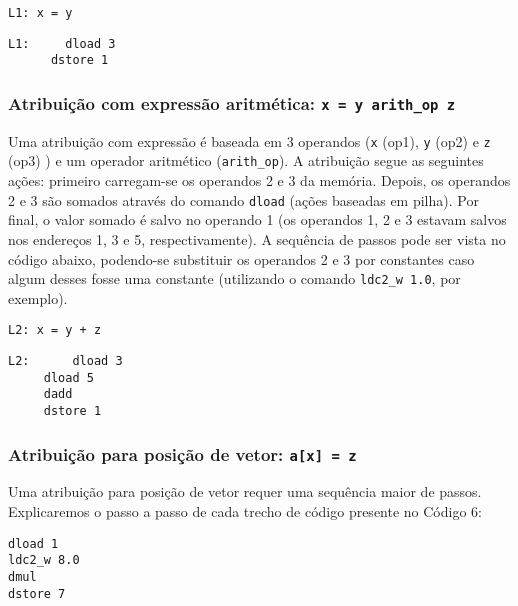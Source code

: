 \begin{lstlisting}[caption=Operação de atribuição em código intermediário.]
L1:	x = y
\end{lstlisting}


\begin{lstlisting}[caption=Operação de atribuição simples em Jasmin.]
L1:		dload 3
      dstore 1
\end{lstlisting}

\subsubsection{Atribuição com expressão aritmética: \texttt{x = y arith\_op z} }

Uma atribuição com expressão é baseada em 3 operandos (\texttt{x} (op1), \texttt{y} (op2) e \texttt{z} (op3) ) e um operador aritmético (\texttt{arith\_op}). A atribuição segue as seguintes ações: primeiro carregam-se os operandos 2 e 3 da memória. Depois, os operandos 2 e 3 são somados através do comando \texttt{dload} (ações baseadas em pilha). Por final, o valor somado é salvo no operando 1 (os operandos 1, 2 e 3 estavam salvos nos endereços 1, 3 e 5, respectivamente). A sequência de passos pode ser vista no código abaixo, podendo-se substituir os operandos 2 e 3 por constantes caso algum desses fosse uma constante (utilizando o comando \texttt{ldc2\_w 1.0}, por exemplo).


\begin{lstlisting}[caption=Operação de atribuição com expressão aritmética em código intermediário.]
L2:	x = y + z
\end{lstlisting}


\begin{lstlisting}[caption=Operação de atribuição com expressão aritmética em Jasmin.]
L2:	     dload 3
     dload 5
     dadd
     dstore 1
\end{lstlisting}


\subsubsection{Atribuição para posição de vetor: \texttt{a[x] = z} }

Uma atribuição para posição de vetor requer uma sequência maior de passos. Explicaremos o passo a passo de cada trecho de código presente no Código 6:

\begin{lstlisting}
dload 1
ldc2_w 8.0
dmul
dstore 7
\end{lstlisting}

